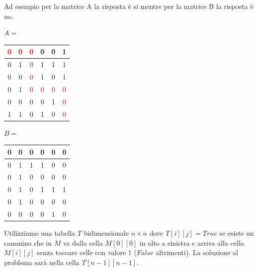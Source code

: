 Ad esempio per la matrice A la risposta è si mentre per la matrice B la risposta è no.
\begin{center}$A=$
    \begin{tabular}{|c|c|c|c|c|c|}
         \hline \textcolor{red}{0}&\textcolor{red}{0}&\textcolor{red}{0}&0&0&1\\\hline
         0&1&\textcolor{red}{0}&1&1&1\\\hline
         0&0&\textcolor{red}{0}&1&0&1\\\hline
         0&1&\textcolor{red}{0}&\textcolor{red}{0}&\textcolor{red}{0}&\textcolor{red}{0}\\\hline
         0&0&0&0&1&\textcolor{red}{0}\\\hline
         1&1&0&1&0&\textcolor{red}{0}\\\hline
    \end{tabular}\hspace{1cm}
    $B=$
    \begin{tabular}{|c|c|c|c|c|c|}
         \hline 0&0&0&0&0&0\\\hline
         0&1&1&1&0&0\\\hline
         0&1&0&0&0&0\\\hline
         0&1&0&1&1&1\\\hline
         0&1&0&0&0&0\\\hline
         0&0&0&0&1&0\\\hline
    \end{tabular}
\end{center}
Utilizziamo una tabella $T$ bidimensionale $n\times n$ dove $T[i][j] = True$ se esiste un cammino che in $M$ va dalla cella $M[0][0]$ in alto a sinistra e arriva alla cella $M[i][j]$ senza toccare celle con valore 1 ($False$ altrimenti). La soluzione al problema sarà nella cella $T[n - 1][n - 1]$.

